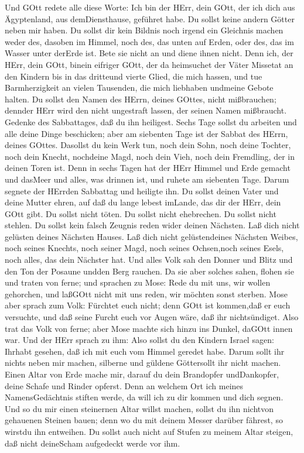  Und GOtt redete alle diese Worte:  Ich bin der
HErr, dein GOtt, der ich dich aus Ägyptenland, aus demDiensthause,
geführet habe.  Du sollst keine andern Götter neben mir
haben.  Du sollst dir kein Bildnis noch irgend ein Gleichnis
machen weder des, dasoben im Himmel, noch des, das unten auf Erden, oder
des, das im Wasser unter derErde ist.  Bete sie nicht an und
diene ihnen nicht. Denn ich, der HErr, dein GOtt, binein eifriger GOtt,
der da heimsuchet der Väter Missetat an den Kindern bis in das dritteund
vierte Glied, die mich hassen,  und tue Barmherzigkeit an
vielen Tausenden, die mich liebhaben undmeine Gebote halten.
 Du sollst den Namen des HErrn, deines GOttes, nicht
mißbrauchen; dennder HErr wird den nicht ungestraft lassen, der seinen
Namen mißbraucht.  Gedenke des Sabbattages, daß du ihn
heiligest.  Sechs Tage sollst du arbeiten und alle deine
Dinge beschicken;  aber am siebenten Tage ist der Sabbat
des HErrn, deines GOttes. Dasollst du kein Werk tun, noch dein Sohn,
noch deine Tochter, noch dein Knecht, nochdeine Magd, noch dein Vieh,
noch dein Fremdling, der in deinen Toren ist.  Denn in
sechs Tagen hat der HErr Himmel und Erde gemacht und dasMeer und alles,
was drinnen ist, und ruhete am siebenten Tage. Darum segnete der HErrden
Sabbattag und heiligte ihn.  Du sollst deinen Vater und
deine Mutter ehren, auf daß du lange lebest imLande, das dir der HErr,
dein GOtt gibt.  Du sollst nicht töten.  Du
sollst nicht ehebrechen.  Du sollst nicht stehlen.
 Du sollst kein falsch Zeugnis reden wider deinen Nächsten.
 Laß dich nicht gelüsten deines Nächsten Hauses. Laß dich
nicht gelüstendeines Nächsten Weibes, noch seines Knechts, noch seiner
Magd, noch seines Ochsen,noch seines Esels, noch alles, das dein
Nächster hat.  Und alles Volk sah den Donner und Blitz und
den Ton der Posaune undden Berg rauchen. Da sie aber solches sahen,
flohen sie und traten von ferne;  und sprachen zu Mose:
Rede du mit uns, wir wollen gehorchen, und laßGOtt nicht mit uns reden,
wir möchten sonst sterben.  Mose aber sprach zum Volk:
Fürchtet euch nicht; denn GOtt ist kommen,daß er euch versuchte, und daß
seine Furcht euch vor Augen wäre, daß ihr nichtsündiget. 
Also trat das Volk von ferne; aber Mose machte sich hinzu ins Dunkel,
daGOtt innen war.  Und der HErr sprach zu ihm: Also sollst
du den Kindern Israel sagen: Ihrhabt gesehen, daß ich mit euch vom
Himmel geredet habe.  Darum sollt ihr nichts neben mir
machen, silberne und güldene Göttersollt ihr nicht machen. 
Einen Altar von Erde mache mir, darauf du dein Brandopfer undDankopfer,
deine Schafe und Rinder opferst. Denn an welchem Ort ich meines
NamensGedächtnis stiften werde, da will ich zu dir kommen und dich
segnen.  Und so du mir einen steinernen Altar willst
machen, sollst du ihn nichtvon gehauenen Steinen bauen; denn wo du mit
deinem Messer darüber fährest, so wirstdu ihn entweihen. 
Du sollst auch nicht auf Stufen zu meinem Altar steigen, daß nicht
deineScham aufgedeckt werde vor ihm.


